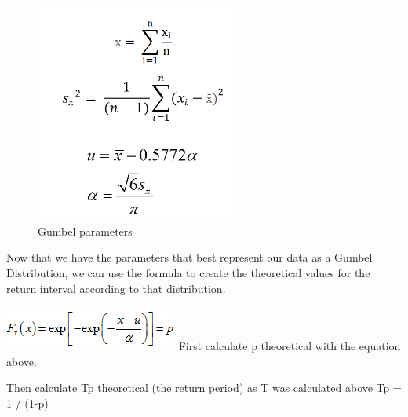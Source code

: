 \documentclass[
]{book}
\newenvironment{Shaded}{\begin{snugshade}}{\end{snugshade}}
\newcommand{\DecValTok}[1]{\textcolor[rgb]{0.00,0.00,0.81}{#1}}
\newcommand{\FloatTok}[1]{\textcolor[rgb]{0.00,0.00,0.81}{#1}}
\newcommand{\FunctionTok}[1]{\textcolor[rgb]{0.00,0.00,0.00}{#1}}
\newcommand{\NormalTok}[1]{#1}
\newcommand{\OtherTok}[1]{\textcolor[rgb]{0.56,0.35,0.01}{#1}}
\newcommand{\SpecialCharTok}[1]{\textcolor[rgb]{0.00,0.00,0.00}{#1}}
\begin{document}
\begin{figure}
\centering
\includegraphics[width=2.58333in,height=\textheight]{images/gumbelparams.png}
\caption{Gumbel parameters}
\end{figure}

\begin{Shaded}
\end{Shaded}

Now that we have the parameters that best represent our data as a Gumbel Distribution, we can use the formula to create the theoretical values for the return interval according to that distribution.

\includegraphics{images/gumbel.png} First calculate p theoretical with the equation above.

Then calculate Tp theoretical (the return period) as T was calculated above Tp = 1 / (1-p)
\end{document}
